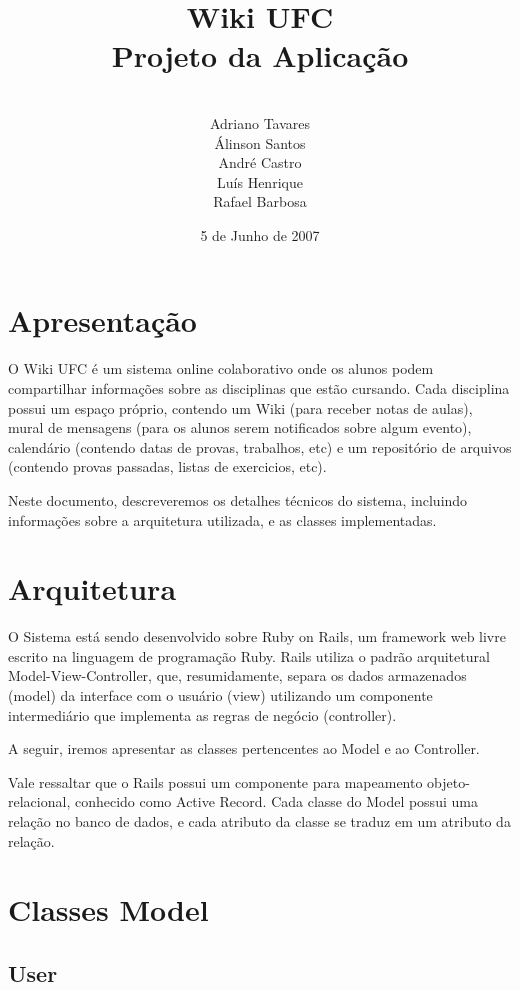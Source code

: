 \documentclass[11pt]{article}
\title{\vspace{8em} \huge{Wiki UFC} \\ \vspace{0.1em} \small{Projeto da Aplicação}}
\author{
	\vspace{5em} \\
	\small{Adriano Tavares} \\
	\small{Álinson Santos}  \\
	\small{André Castro}    \\
	\small{Luís Henrique}   \\
	\small{Rafael Barbosa}
}
\date{5 de Junho de 2007}
\begin{document}
\maketitle
\pagebreak

\tableofcontents
\pagebreak

\section{Apresentação}

O Wiki UFC é um sistema online colaborativo onde os alunos podem compartilhar informações sobre as
disciplinas que estão cursando. Cada disciplina possui um espaço próprio, contendo um Wiki (para
receber notas de aulas), mural de mensagens (para os alunos serem notificados sobre algum evento),
calendário (contendo datas de provas, trabalhos, etc) e um repositório de arquivos (contendo provas
passadas, listas de exercicios, etc).

Neste documento, descreveremos os detalhes técnicos do sistema, incluindo informações sobre a
arquitetura utilizada, e as classes implementadas.

\section{Arquitetura}

O Sistema está sendo desenvolvido sobre Ruby on Rails, um framework web livre escrito na linguagem
de programação Ruby. Rails utiliza o padrão arquitetural Model-View-Controller, que, resumidamente,
separa os dados armazenados (model) da interface com o usuário (view) utilizando um componente
intermediário que implementa as regras de negócio (controller).

A seguir, iremos apresentar as classes pertencentes ao Model e ao Controller.

Vale ressaltar que o Rails possui um componente para mapeamento objeto-relacional, conhecido como
Active Record. Cada classe do Model possui uma relação no banco de dados, e cada atributo da classe
se traduz em um atributo da relação. 

\section{Classes Model}

\subsection{User}
\end{document}
